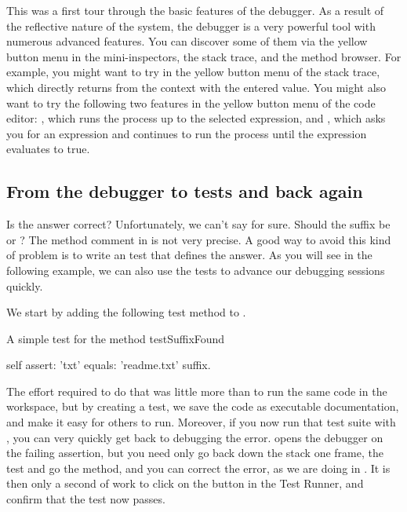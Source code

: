 \documentclass[a4paper,10pt,twoside]{book}
\begin{document}
This was a first tour through the basic features of the debugger. 
As a result of the reflective nature of the \squeak system, the debugger is a very powerful tool with numerous advanced features.
You can discover some of them via the yellow button menu in the mini-inspectors, the stack trace, and the method browser.
For example, you might want to try  in the yellow button menu of the stack trace, which directly returns from the context with the entered value.
You might also want to try the following two features in the yellow button menu of the code editor: , which runs the process up to the selected expression, and , which asks you for an expression and continues to run the process until the expression evaluates to true.

\subsection{From the debugger to tests and back again}

Is the answer correct?
Unfortunately, we can't say for sure.
Should the suffix be  or ?
The method comment in  is not very precise.
A good way to avoid this kind of problem is to write an  test that defines the answer.
As you will see in the following example, we can also use the tests to advance our debugging sessions quickly.

We start by adding the following test method  to .

\begin{method}[testSuffix]{A simple test for the  method}
testSuffixFound

	self assert: 'txt' equals: 'readme.txt' suffix.
\end{method}

The effort required to do that was little more than to run the same code in the workspace, but by creating a test, we save the code as executable documentation, and make it easy for others to run.
Moreover, if you now run that test suite with \sunit, you can very quickly get back to debugging the error.
\sunit opens the debugger on the failing assertion, but you need only go back down the stack one frame,  the test and go  the  method, and you can correct the error, as we are doing in .
It is then only a second of work to click on the  button in the \sunit Test Runner, and confirm that the test now passes.
\end{document}
